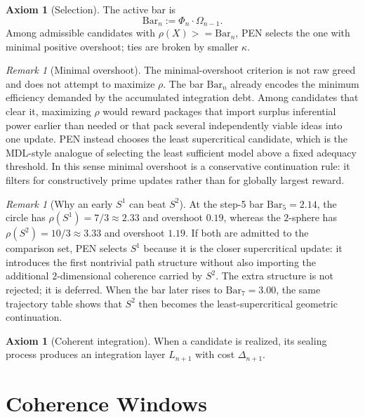 \documentclass[11pt,a4paper]{article}
\def\geq{>=}%
\theoremstyle{plain}
\theoremstyle{definition}
\newtheorem{axiom}[theorem]{Axiom}
\theoremstyle{remark}
\newtheorem{remark}[theorem]{Remark}
\newcommand{\SelBar}{\mathrm{Bar}}
\begin{document}
\begin{axiom}[Selection]
\label{ax:selection}
The active bar is
\[
  \SelBar_n:=\Phi_n\cdot\Omega_{n-1}.
\]
Among admissible candidates with $\rho(X)\geq \SelBar_n$, PEN selects the one with minimal positive overshoot; ties are broken by smaller $\kappa$.
\end{axiom}

\begin{remark}[Minimal overshoot]
\label{rem:minimal-overshoot}
The minimal-overshoot criterion is not raw greed and does not attempt to maximize $\rho$.  The bar $\SelBar_n$ already encodes the minimum efficiency demanded by the accumulated integration debt.  Among candidates that clear it, maximizing $\rho$ would reward packages that import surplus inferential power earlier than needed or that pack several independently viable ideas into one update.  PEN instead chooses the least supercritical candidate, which is the MDL-style analogue of selecting the least sufficient model above a fixed adequacy threshold.  In this sense minimal overshoot is a conservative continuation rule: it filters for constructively prime updates rather than for globally largest reward.
\end{remark}

\begin{remark}[Why an early $S^1$ can beat $S^2$]
\label{rem:s1-s2-overshoot}
At the step-5 bar $\SelBar_5=2.14$, the circle has $\rho(S^1)=7/3\approx 2.33$ and overshoot $0.19$, whereas the $2$-sphere has $\rho(S^2)=10/3\approx 3.33$ and overshoot $1.19$.  If both are admitted to the comparison set, PEN selects $S^1$ because it is the closer supercritical update: it introduces the first nontrivial path structure without also importing the additional $2$-dimensional coherence carried by $S^2$.  The extra structure is not rejected; it is deferred.  When the bar later rises to $\SelBar_7=3.00$, the same trajectory table shows that $S^2$ then becomes the least-supercritical geometric continuation.
\end{remark}

\begin{axiom}[Coherent integration]
\label{ax:integration}
When a candidate is realized, its sealing process produces an integration layer $L_{n+1}$ with cost $\Delta_{n+1}$.
\end{axiom}

\section{Coherence Windows}
\label{sec:coherence}
\end{document}

